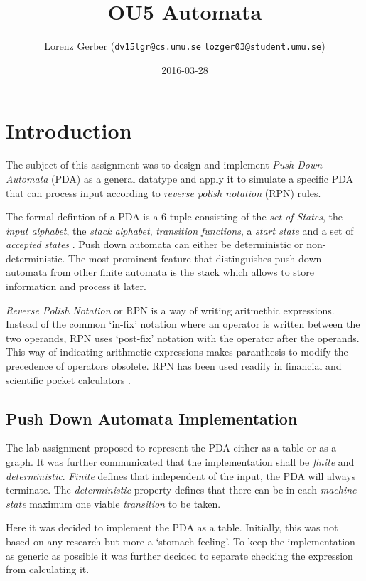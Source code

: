 \documentclass[a4paper,11pt,twoside]{article}
\title{OU5 Automata}
\author{Lorenz Gerber ({\tt{dv15lgr@cs.umu.se}} {\tt{lozger03@student.umu.se}})}
\date{2016-03-28}
\begin{document}
\lstset{language=C}
\maketitle
\thispagestyle{empty}
\newpage
\tableofcontents
\thispagestyle{empty}
\newpage

\clearpage
{}

\section{Introduction} 
The subject of this assignment was to design and implement \textit{Push Down
Automata} (PDA) as a general datatype and apply it to simulate a
specific PDA that can process input according to \textit{reverse
  polish notation} (RPN) rules.

The formal defintion of a PDA is a 6-tuple consisting of the \textit{set of
States}, the \textit{input alphabet}, the \textit{stack alphabet},
\textit{transition functions}, a \textit{start state} and a set of
\textit{accepted states} \cite[p. 113]{sipser2012}. Push down automata can either be deterministic or
non-deterministic. The most prominent feature that distinguishes
push-down automata from other finite automata is the stack which allows to store information and process it later. 

\textit{Reverse Polish Notation} or RPN is a way of writing aritmethic
expressions. Instead of the common `in-fix' notation where an operator
is written between the two operands, RPN uses `post-fix' notation with
the operator after the operands. This way of indicating arithmetic
expressions makes paranthesis to modify the precedence of operators
obsolete. RPN has been used readily in financial and scientific pocket
calculators \cite{rpn}.  

\subsection{Push Down Automata Implementation}
The lab assignment proposed to represent the PDA either as a table or
as a graph. It was further communicated that the implementation shall be
\textit{finite} and \textit{deterministic}. \textit{Finite} defines
that independent of the input, the PDA will always terminate. The
\textit{deterministic} property defines that there can be in each
\textit{machine state} maximum one viable \textit{transition} to be
taken.   

Here it was decided to implement the PDA as a table. Initially, this
was not based on any research but more a `stomach feeling'.  To keep
the implementation as generic as possible it was further decided to 
separate checking the expression from calculating it. 
\end{document}
